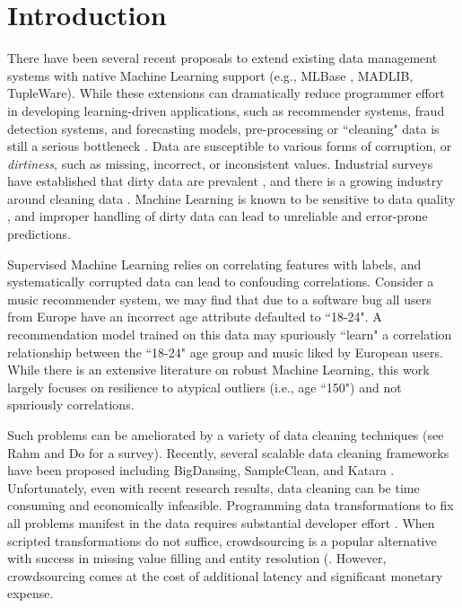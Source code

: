 \section{Introduction}
There have been several recent proposals to extend existing data management systems with native Machine Learning support (e.g., MLBase \cite{kraska2013mlbase}, MADLIB\cite{hellerstein2012madlib}, TupleWare\cite{crotty2014tupleware}).
While these extensions can dramatically reduce programmer effort in developing learning-driven applications, such as recommender systems, fraud detection systems, and forecasting models, pre-processing or ``cleaning" data is still a serious bottleneck \cite{kandel2012}. 
Data are susceptible to various forms of corruption, or \emph{dirtiness}, such as missing, incorrect, or inconsistent values.
Industrial surveys have established that dirty data are prevalent \cite{Gartner}, and there is a growing industry around cleaning data \cite{fortunearticle}.
Machine Learning is known to be sensitive to data quality \cite{xiaofeature}, and improper handling of dirty data can lead to unreliable and error-prone predictions.

Supervised Machine Learning relies on correlating features with labels, and systematically corrupted data can lead to confouding correlations.
Consider a music recommender system, we may find that due to a software bug all users from Europe have an incorrect age attribute defaulted to ``18-24".
A recommendation model trained on this data may spuriously ``learn" a correlation relationship between the ``18-24" age group and music liked by European users.
While there is an extensive literature on robust Machine Learning, this work largely focuses on resilience to atypical outliers (i.e., age ``150") and not spuriously correlations.

Such problems can be ameliorated by a variety of data cleaning techniques (see Rahm and Do \cite{rahm2000data} for a survey).
Recently, several scalable data cleaning frameworks have been proposed including BigDansing\cite{khayyat2015bigdansing}, SampleClean\cite{sampleclean}, and Katara \cite{chu2015katara}. 
Unfortunately, even with recent research results, data cleaning can be time consuming and economically infeasible\cite{wang1999sample}.
Programming data transformations to fix all problems manifest in the data requires substantial developer effort \cite{kandel2012}.
When scripted transformations do not suffice, crowdsourcing is a popular alternative with success in missing value filling and entity resolution (\cite{gokhale2014corleone, park2014crowdfill, sampleclean,chu2015katara}.
However, crowdsourcing comes at the cost of additional latency and significant monetary expense.

